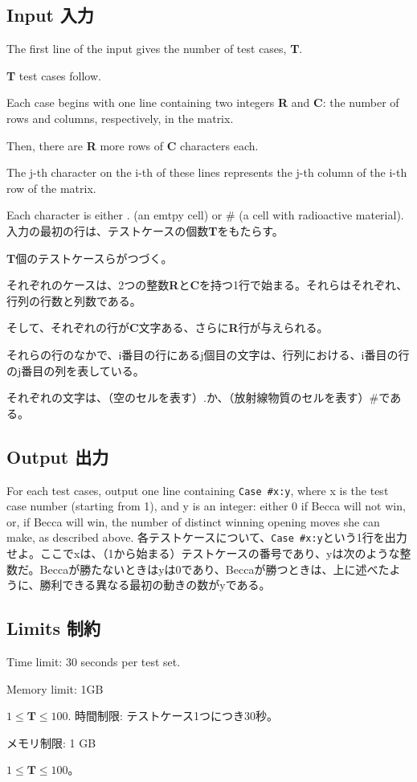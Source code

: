\documentclass[uplatex,dvipdfmx]{jsarticle} \usepackage{amsmath,amssymb,bm}
\begin{document}
\subsection*{Input 入力}
\begin{paracol}{2}
The first line of the input gives the number of test cases, {\bf T}.

{\bf T} test cases follow.

Each case begins with one line containing two integers {\bf R} and {\bf C}: the number of rows and columns, respectively, in the matrix.

Then, there are {\bf R} more rows of {\bf C} characters each.

The j-th character on the i-th of these lines represents the j-th column of the i-th row of the matrix.

Each character is either . (an emtpy cell) or \# (a cell with radioactive material).
\switchcolumn
入力の最初の行は、テストケースの個数{\bf T}をもたらす。

{\bf T}個のテストケースらがつづく。

それぞれのケースは、2つの整数{\bf R}と{\bf C}を持つ1行で始まる。それらはそれぞれ、行列の行数と列数である。

そして、それぞれの行が{\bf C}文字ある、さらに{\bf R}行が与えられる。

それらの行のなかで、i番目の行にあるj個目の文字は、行列における、i番目の行のj番目の列を表している。

それぞれの文字は、（空のセルを表す）.か、（放射線物質のセルを表す）\#である。
\end{paracol}
\subsection*{Output 出力}
\begin{paracol}{2}
For each test cases, output one line containing {\tt Case \#x:\;y}, where x is the test case number (starting from 1), and y is an integer: either 0 if Becca will not win, or, if Becca will win, the number of distinct winning opening moves she can make, as described above.
\switchcolumn
各テストケースについて、{\tt Case \#x:\;y}という1行を出力せよ。ここでxは、（1から始まる）テストケースの番号であり、yは次のような整数だ。Beccaが勝たないときはyは0であり、Beccaが勝つときは、上に述べたように、勝利できる異なる最初の動きの数がyである。
\end{paracol}
\subsection*{Limits 制約}
\begin{paracol}{2}
Time limit: 30 seconds per test set.

Memory limit: 1GB

$1 \leq \mathbf{T} \leq 100$.
\switchcolumn
時間制限: テストケース1つにつき30秒。

メモリ制限: 1 GB

$1 \leq \mathbf{T} \leq 100$。
\end{paracol}
\end{document}
